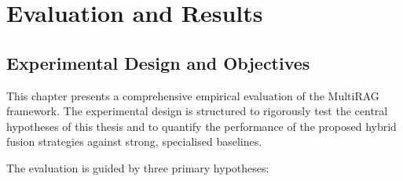 \documentclass[12pt,twoside]{report}
\begin{document}




\chapter{Evaluation and Results} \label{chap:Results}

\section{Experimental Design and Objectives}

This chapter presents a comprehensive empirical evaluation of the MultiRAG framework. The experimental design is structured to rigorously test the central hypotheses of this thesis and to quantify the performance of the proposed hybrid fusion strategies against strong, specialised baselines.

The evaluation is guided by three primary hypotheses:
\end{document}
